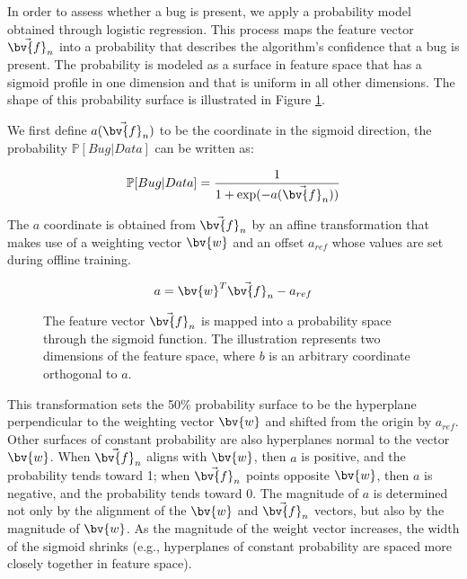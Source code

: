 
In order to assess whether a bug is present, we apply a probability
model obtained through logistic regression. This process maps the
feature vector $\vec{\bv{f}}_n$ into a probability that describes
the algorithm's confidence that a bug is present.  The probability is
modeled as a surface in feature space that has a sigmoid
profile in one dimension and that is uniform in all other
dimensions. The shape of this probability surface is illustrated in
Figure \ref{fig:sigmoid}.

We first define $a(\vec{\bv{f}}_n)$ to be the coordinate in the sigmoid direction,
the probability $\mathbb{P}[Bug | Data]$ can be written as:

\begin{equation}
  \label{e:prob_bug}
  \mathbb{P}[Bug | Data] = \frac{1}{1 + \exp(-a(\vec{\bv{f}}_n))}
\end{equation}

The $a$ coordinate is obtained from $\vec{\bv{f}}_n$ by an affine
transformation that makes use of a weighting vector $\bv{w}$ and an
offset $a_{ref}$ whose values are set during offline training. 

\begin{equation}
  \label{e:logreg}
  a = \bv{w}^T \vec{\bv{f}}_n - a_{ref}
\end{equation}

\begin{figure}[h]
  \caption{The feature vector $\vec{\bv{f}}_n$ is mapped into a probability
    space through the sigmoid function. The illustration represents
    two dimensions of the feature space, where $b$ is an arbitrary
    coordinate orthogonal to $a$.}
  \label{fig:sigmoid}
\end{figure}

This transformation sets the 50\% probability surface to be the
hyperplane perpendicular to the weighting vector $\bv{w}$ and shifted
from the origin by $a_{ref}$.  Other surfaces of constant probability
are also hyperplanes normal to the vector $\bv{w}$.  When $\vec{\bv{f}}_n$
aligns with $\bv{w}$, then $a$ is positive, and the probability tends
toward 1; when $\vec{\bv{f}}_n$ points opposite $\bv{w}$, then $a$ is
negative, and the probability tends toward 0.  The magnitude of $a$ is
determined not only by the alignment of the $\bv{w}$ and
$\vec{\bv{f}}_n$ vectors, but
also by the magnitude of $\bv{w}$.  As the magnitude of the weight
vector increases, the width of the sigmoid shrinks (e.g., hyperplanes
of constant probability are spaced more closely together in feature
space).

